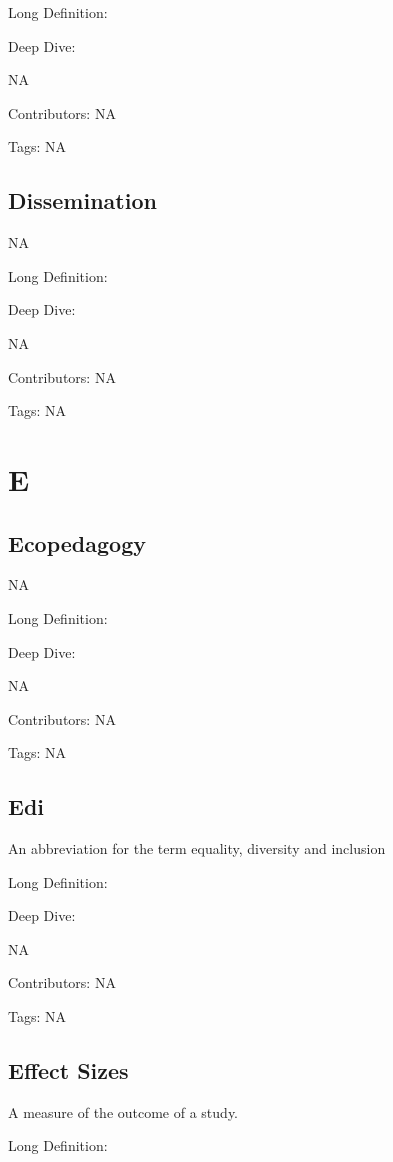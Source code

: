 \documentclass[
  letterpaper,
  DIV=11,
  numbers=noendperiod]{scrreprt}
\begin{document}
Long Definition:

Deep Dive:

NA

Contributors: NA

Tags: NA

\section{Dissemination}\label{dissemination}

NA

Long Definition:

Deep Dive:

NA

Contributors: NA

Tags: NA


\chapter{E}\label{e}

\section{Ecopedagogy}\label{ecopedagogy}

NA

Long Definition:

Deep Dive:

NA

Contributors: NA

Tags: NA

\section{Edi}\label{edi}

An abbreviation for the term equality, diversity and inclusion

Long Definition:

Deep Dive:

NA

Contributors: NA

Tags: NA

\section{Effect Sizes}\label{effect-sizes}

A measure of the outcome of a study.

Long Definition:
\end{document}
